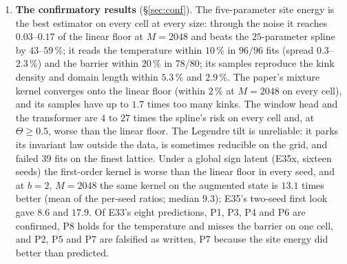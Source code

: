 \documentclass[10pt,a4paper]{article}
\newcommand{\Th}{\Theta}
\newcommand{\st}[1]{\textbf{#1}}
\theoremstyle{plain}
\theoremstyle{remark}
\begin{document}
\begin{enumerate}[leftmargin=1.4em,itemsep=0.15em]
  transformer under both interfaces, the oracles; the physical statistics the consolidated note
  asks for; the clean-data interface. Eleven predictions were registered before any confirmatory
  cell ran; one Legendre fit crashed the kernel jobs on the finest lattice, and amendment~3 (a failed fit
  is a row counted against the prediction, never a crash) was registered before any kernel row was read.
\item \st{The confirmatory results} (\S\ref{sec:conf}). The five-parameter site energy is the best
  estimator on every cell at every size: through the noise it reaches $0.03$--$0.17$ of the linear floor at
  $M=2048$ and beats the $25$-parameter spline by $43$--$59\,\%$; it reads the temperature within $10\,\%$
  in $96/96$ fits (spread $0.3$--$2.3\,\%$) and the barrier within $20\,\%$ in $78/80$; its samples reproduce
  the kink density and domain length within $5.3\,\%$ and $2.9\,\%$. The paper's mixture kernel converges onto
  the linear floor (within $2\,\%$ at $M=2048$ on every cell), and its samples have up to $1.7$ times too many
  kinks. The window head and the transformer are $4$ to $27$ times the spline's risk on every cell and, at
  $\Th\ge0.5$, worse than the linear floor. The Legendre tilt is unreliable: it parks its invariant law
  outside the data, is sometimes reducible on the grid, and failed $39$ fits on the finest lattice. Under a
  global sign latent (E35x, sixteen seeds) the first-order kernel is worse than the linear floor in every seed, and at
  $b=2$, $M=2048$ the same kernel on the augmented state is $13.1$ times better (mean of the per-seed ratios; median
  $9.3$); E35's two-seed first look gave $8.6$ and $17.9$. Of E33's eight predictions, P1, P3, P4 and P6 are
  confirmed, P8 holds for the temperature and misses the barrier on one cell, and P2, P5 and P7 are falsified
  as written, P7 because the site energy did better than predicted.
\end{enumerate}
\end{document}

